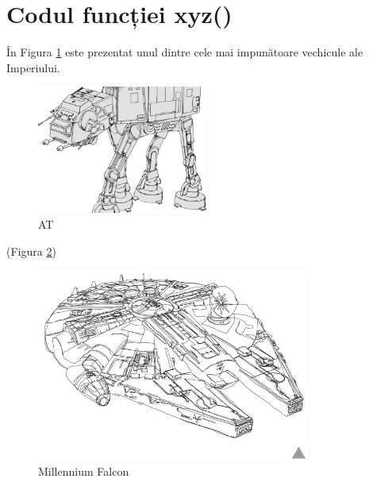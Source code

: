 \newpage
\section{Codul funcției xyz()}
\label{anexa3:func_xyz}

În Figura \ref{fig:AT} este prezentat unul dintre cele mai impunătoare vechicule ale Imperiului.

\begin{figure}[H]
    \centering
    \includegraphics[width=0.5\textwidth]{anexe/figuri/AT.png}
    \caption{AT\protect\footnotemark}
    \label{fig:AT}
\end{figure}

\textcolor{gray}{\lipsum} (Figura \ref{fig:millennium_falcon})

\begin{figure}[H]
    \centering
    \includegraphics[width=0.8\textwidth]{anexe/figuri/millennium_falcon.jpeg}
    \caption{Millennium Falcon\protect\footnotemark}
    \label{fig:millennium_falcon}
\end{figure}

